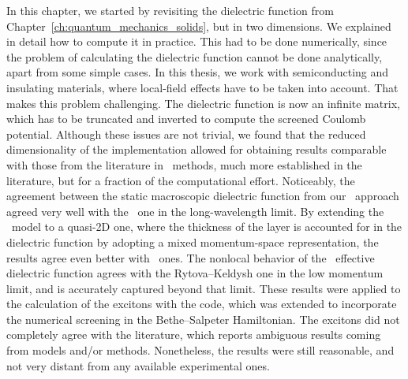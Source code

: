 In this chapter, we started by revisiting the dielectric function from Chapter~\ref{ch:quantum_mechanics_solids}, but in two dimensions.
We explained in detail how to compute it in practice.
This had to be done numerically, since the problem of calculating the dielectric function cannot be done analytically, apart from some simple cases.
In this thesis, we work with semiconducting and insulating materials, where local-field effects have to be taken into account.
That makes this problem challenging.
The dielectric function is now an infinite matrix, which has to be truncated and inverted to compute the screened Coulomb potential.
Although these issues are not trivial, we found that the reduced dimensionality of the implementation allowed for obtaining results comparable with those from the literature in \abinit~methods, much more established in the literature, but for a fraction of the computational effort.
Noticeably, the agreement between the static macroscopic dielectric function from our \bd~approach agreed very well with the \abinit~one in the long-wavelength limit.
By extending the \bd~model to a quasi-2D one, where the thickness of the layer is accounted for in the dielectric function by adopting a mixed momentum-space representation, the results agree even better with \abinit~ones.
The nonlocal behavior of the \bd~effective dielectric function agrees with the Rytova--Keldysh one in the low momentum limit, and is accurately captured beyond that limit.
These results were applied to the calculation of the excitons with the code, which was extended to incorporate the numerical screening in the Bethe--Salpeter Hamiltonian.
The excitons did not completely agree with the literature, which reports ambiguous results coming from models and/or methods.
Nonetheless, the results were still reasonable, and not very distant from any available experimental ones.

\vspace{0.7cm}
\vspace{0.7cm}

